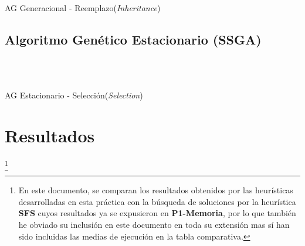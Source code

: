 \documentclass[a4paper, 11pt]{article}
\begin{document}
			
			\begin{algorithm}[H]
				\begin{algorithmic}[1]
				\REQUIRE \ \\
						 \
						
					\ENDIF
				\ENDFOR
				
				
					\ENDIF
				\ENDFOR
				\end{algorithmic}
			\caption{AG Generacional - Reemplazo(\textit{Inheritance})}
			\label{GGA-Inher}
			\end{algorithm}
			
			
		\subsection{Algoritmo Genético Estacionario (\textbf{SSGA})}
			
			
			\begin{algorithm}[H]
				\begin{algorithmic}[1]
				\REQUIRE \ \\
						 \
				
					\ENDIF
				\ENDWHILE
				
				\end{algorithmic}
			\caption{AG Estacionario - Selección(\textit{Selection})}
			\label{SSGA-Selec}
			\end{algorithm}
			
			
			
		
	\section{Resultados}\footnote{En este documento, se comparan los resultados obtenidos por las
	heurísticas desarrolladas en esta práctica con la búsqueda de soluciones por la heurística
	\textbf{SFS} cuyos resultados ya se expusieron en \textbf{P1-Memoria}, por lo que también he
	obviado su inclusión en este documento en toda su extensión mas sí han sido incluidas las medias
	de ejecución en la tabla comparativa.}
\end{document}

